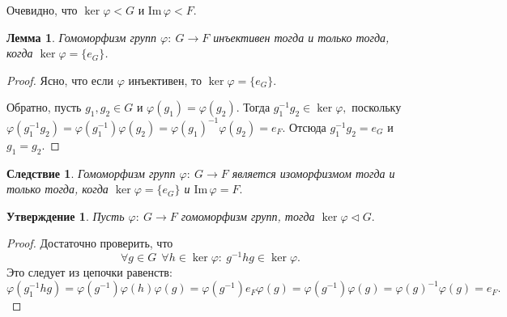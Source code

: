 \documentclass[a4paper, 14pt]{extarticle}
\newcommand{\n}{\par}
\newcommand{\im}{\mathrm{Im} \,}
\renewcommand{\phi}{\varphi}
\theoremstyle{definition}
\theoremstyle{plain}
\numberwithin{theorem}{section}
\numberwithin{definition}{section}
\newtheorem*{statement*}{Утверждение}
\numberwithin{statement}{section}
\newtheorem*{lemma*}{Лемма}
\numberwithin{lemma}{section}
\newtheorem*{consequence*}{Следствие}
\numberwithin{consequence}{section}
\begin{document}
		Очевидно, что $\ker \phi < G$ и Im$\, \phi < F.$
		\begin{lemma*}
			Гомоморфизм групп ${\phi{:} \ G \rightarrow F}$ инъективен тогда и только тогда, когда  $\ker \phi = \{e_G\}$.
		\end{lemma*}
		\begin{proof}
			Ясно, что если $\phi$ инъективен, то $\ker \phi = \{e_G\}.$ \n
			Обратно, пусть ${g_1, g_2 \in G}$ и ${\phi(g_1) = \phi(g_2).}$ Тогда ${g^{-1}_1g_2 \in \ker \phi,}$ поскольку ${\phi(g^{-1}_1g_2) = \phi(g^{-1}_1) \phi(g_2) = \phi(g_1)^{-1} \phi(g_2) = e_F.}$ Отсюда $g^{-1}_1g_2 = e_G$ и $g_1 = g_2.$
		\end{proof}
		\begin{consequence*}
			Гомоморфизм групп ${\phi{:} \ G \rightarrow F}$ является изоморфизмом тогда и только тогда, когда ${\ker \phi = \{e_G\}}$ и ${\im \phi = F.}$
		\end{consequence*}
		\begin{statement*}
			Пусть ${\phi{:} \ G \rightarrow F}$ гомоморфизм групп, тогда $\ker \phi \lhd G.$
		\end{statement*}
		\begin{proof}
			Достаточно проверить, что
			\begin{equation*}
				\forall g \in G \ \ \forall h \in \ker \phi{:} \ g^{-1}hg \in \ker \phi.
			\end{equation*}
			Это следует из цепочки равенств:
			\begin{equation*}
				\phi(g^{-1}_1hg) = \phi(g^{-1}) \phi(h) \phi(g) = \phi(g^{-1}) e_F \phi(g) = \phi(g^{-1}) \phi(g) = \phi(g)^{-1} \phi(g) = e_F.
			\end{equation*}
		\end{proof}
	\newpage
\end{document}
